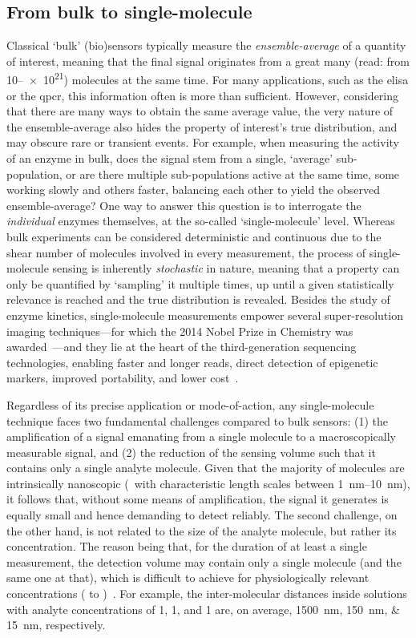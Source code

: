 \subsection{From bulk to single-molecule}

Classical `bulk' (bio)sensors typically measure the \emph{ensemble-average} of a quantity of interest, meaning
that the final signal originates from a great many (read: from \numrange{10}{e21}) molecules at the same time.
For many applications, such as the \gls{elisa} or the \gls{qpcr}, this information often is more than
sufficient. However, considering that there are many ways to obtain the same average value, the very nature of
the ensemble-average also hides the property of interest's true distribution, and may obscure rare or
transient events. For example, when measuring the activity of an enzyme in bulk, does the signal stem from a
single, `average' sub-population, or are there multiple sub-populations active at the same time, some working
slowly and others faster, balancing each other to yield the observed ensemble-average? One way to answer this
question is to interrogate the \emph{individual} enzymes themselves, at the so-called `single-molecule' level.
Whereas bulk experiments can be considered deterministic and continuous due to the shear number of molecules
involved in every measurement, the process of single-molecule sensing is inherently \emph{stochastic} in
nature, meaning that a property can only be quantified by `sampling' it multiple times, up until a given
statistically relevance is reached and the true distribution is revealed. Besides the study of enzyme
kinetics, single-molecule measurements empower several super-resolution imaging techniques---for which the
2014 Nobel Prize in Chemistry was awarded~\cite{Weiss-2014}---and they lie at the heart of the
third-generation sequencing technologies, enabling faster and longer reads, direct detection of epigenetic
markers, improved portability, and lower cost~\cite{Schadt-2010}.

Regardless of its precise application or mode-of-action, any single-molecule technique faces two fundamental
challenges compared to bulk sensors: (1) the amplification of a signal emanating from a single molecule to a
macroscopically measurable signal, and (2) the reduction of the sensing volume such that it contains only a
single analyte molecule. Given that the majority of molecules are intrinsically nanoscopic (\ie~with
characteristic length scales between \SIrange[range-phrase= and ]{1}{10}{\nm}), it follows that, without some
means of amplification, the signal it generates is equally small and hence demanding to detect reliably. The
second challenge, on the other hand, is not related to the size of the analyte molecule, but rather its
concentration. The reason being that, for the duration of at least a single measurement, the detection volume
may contain only a single molecule (and the same one at that), which is difficult to achieve for
physiologically relevant concentrations (\si{\uM} to \si{\mM})~\cite{Zhu-2012}. For example, the
inter-molecular distances inside solutions with analyte concentrations of \SI{1}{\nM}, \SI{1}{\uM}, and
\SI{1}{\mM} are, on average, \SIlist{1500;150;15}{\nm}, respectively.


